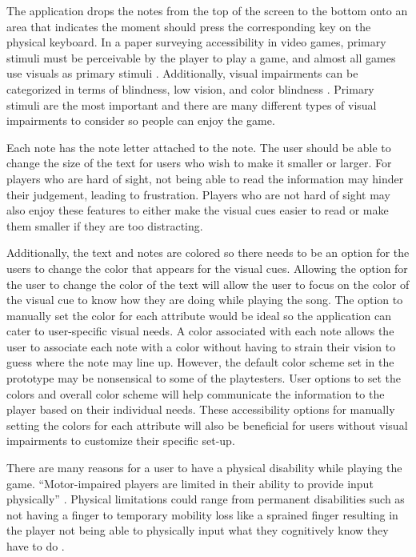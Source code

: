 \documentclass[10pt,twocolumn]{article}
\begin{document}
The application drops the notes from the top of the screen to the bottom onto an area that indicates the moment should press the corresponding key on the physical keyboard. In a paper surveying accessibility in video games, primary stimuli must be perceivable by the player to play a game, and almost all games use visuals as primary stimuli \cite{Yuan}. Additionally, visual impairments can be categorized in terms of blindness, low vision, and color blindness \cite{Bierre}. Primary stimuli are the most important and there are many different types of visual impairments to consider so people can enjoy the game. 

Each note has the note letter attached to the note. The user should be able to change the size of the text for users who wish to make it smaller or larger. For players who are hard of sight, not being able to read the information may hinder their judgement, leading to frustration. Players who are not hard of sight may also enjoy these features to either make the visual cues easier to read or make them smaller if they are too distracting. 

Additionally, the text and notes are colored so there needs to be an option for the users to change the color that appears for the visual cues. Allowing the option for the user to change the color of the text will allow the user to focus on the color of the visual cue to know how they are doing while playing the song. The option to manually set the color for each attribute would be ideal so the application can cater to user-specific visual needs. A color associated with each note allows the user to associate each note with a color without having to strain their vision to guess where the note may line up. However, the default color scheme set in the prototype may be nonsensical to some of the playtesters. User options to set the colors and overall color scheme will help communicate the information to the player based on their individual needs. These accessibility options for manually setting the colors for each attribute will also be beneficial for users without visual impairments to customize their specific set-up.


There are many reasons for a user to have a physical disability while playing the game. “Motor-impaired players are limited in their ability to provide input physically” \cite{Yuan}. Physical limitations could range from permanent disabilities such as not having a finger to temporary mobility loss like a sprained finger resulting in the player not being able to physically input what they cognitively know they have to do \cite{Bierre}. 
 
\end{document}
